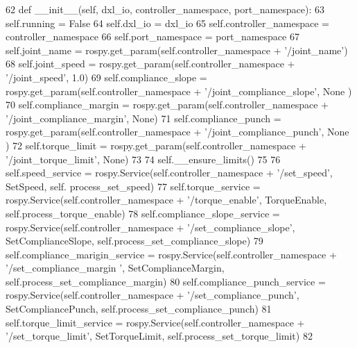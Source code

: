 \begin{DoxyCode}
62     \textcolor{keyword}{def }\_\_init\_\_(self, dxl\_io, controller\_namespace, port\_namespace):
63         self.running = \textcolor{keyword}{False}
64         self.dxl\_io = dxl\_io
65         self.controller\_namespace = controller\_namespace
66         self.port\_namespace = port\_namespace
67         self.joint\_name = rospy.get\_param(self.controller\_namespace + \textcolor{stringliteral}{'/joint\_name'})
68         self.joint\_speed = rospy.get\_param(self.controller\_namespace + \textcolor{stringliteral}{'/joint\_speed'}, 1.0)
69         self.compliance\_slope = rospy.get\_param(self.controller\_namespace + \textcolor{stringliteral}{'/joint\_compliance\_slope'}, \textcolor{keywordtype}{None}
      )
70         self.compliance\_margin = rospy.get\_param(self.controller\_namespace + \textcolor{stringliteral}{'/joint\_compliance\_margin'}, \textcolor{keywordtype}{
      None})
71         self.compliance\_punch = rospy.get\_param(self.controller\_namespace + \textcolor{stringliteral}{'/joint\_compliance\_punch'}, \textcolor{keywordtype}{None}
      )
72         self.torque\_limit = rospy.get\_param(self.controller\_namespace + \textcolor{stringliteral}{'/joint\_torque\_limit'}, \textcolor{keywordtype}{None})
73         
74         self.\_\_ensure\_limits()
75         
76         self.speed\_service = rospy.Service(self.controller\_namespace + \textcolor{stringliteral}{'/set\_speed'}, SetSpeed, self.
      process\_set\_speed)
77         self.torque\_service = rospy.Service(self.controller\_namespace + \textcolor{stringliteral}{'/torque\_enable'}, TorqueEnable, 
      self.process\_torque\_enable)
78         self.compliance\_slope\_service = rospy.Service(self.controller\_namespace + \textcolor{stringliteral}{'/set\_compliance\_slope'}, 
      SetComplianceSlope, self.process\_set\_compliance\_slope)
79         self.compliance\_marigin\_service = rospy.Service(self.controller\_namespace + \textcolor{stringliteral}{'/set\_compliance\_margin
      '}, SetComplianceMargin, self.process\_set\_compliance\_margin)
80         self.compliance\_punch\_service = rospy.Service(self.controller\_namespace + \textcolor{stringliteral}{'/set\_compliance\_punch'}, 
      SetCompliancePunch, self.process\_set\_compliance\_punch)
81         self.torque\_limit\_service = rospy.Service(self.controller\_namespace + \textcolor{stringliteral}{'/set\_torque\_limit'}, 
      SetTorqueLimit, self.process\_set\_torque\_limit)
82 
\end{DoxyCode}


